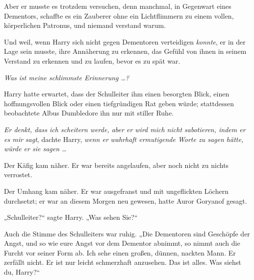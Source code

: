 Aber er musste es trotzdem versuchen, denn manchmal, in Gegenwart eines Dementors, schaffte es ein Zauberer ohne ein Lichtflimmern zu einem vollen, körperlichen Patronus, und niemand verstand warum.

Und weil, wenn Harry sich nicht gegen Dementoren verteidigen \emph{konnte}, er in der Lage sein musste, ihre Annäherung zu erkennen, das Gefühl von ihnen in seinem Verstand zu erkennen und zu laufen, bevor es zu spät war.

\emph{Was ist meine schlimmste Erinnerung …?}

Harry hatte erwartet, dass der Schulleiter ihm einen besorgten Blick, einen hoffnungsvollen Blick oder einen tiefgründigen Rat geben würde; stattdessen beobachtete Albus Dumbledore ihn nur mit stiller Ruhe.

\emph{Er denkt, dass ich scheitern werde, aber er wird mich nicht sabotieren, indem er es mir sagt}, dachte Harry, \emph{wenn er} \emph{wahrhaft ermutigende Worte zu sagen hätte, würde er sie sagen …}

Der Käfig kam näher. Er war bereits angelaufen, aber noch nicht zu nichts verrostet.

Der Umhang kam näher. Er war ausgefranst und mit ungeflickten Löchern durchsetzt; er war an diesem Morgen neu gewesen, hatte Auror Goryanof gesagt.

„Schulleiter?“ sagte Harry.
„Was sehen Sie?“

Auch die Stimme des Schulleiters war ruhig.
„Die Dementoren sind Geschöpfe der Angst, und so wie eure Angst vor dem Dementor abnimmt, so nimmt auch die Furcht vor seiner Form ab. Ich sehe einen großen, dünnen, nackten Mann. Er zerfällt nicht. Er ist nur leicht schmerzhaft anzusehen. Das ist alles. Was siehst du, Harry?“

